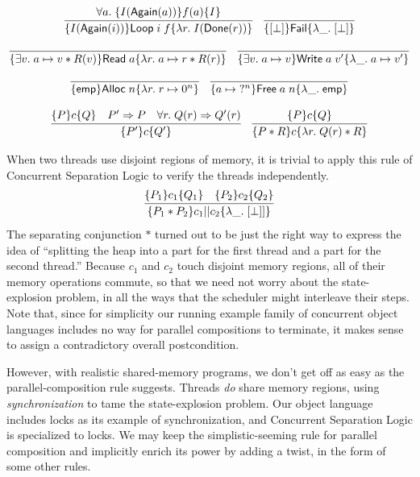 \documentclass{amsbook}
\theoremstyle{definition}
\theoremstyle{remark}
\numberwithin{section}{chapter}
\numberwithin{equation}{chapter}
\begin{document}
$$\infer{\hoare{I(\mt{Again}(i))}{\mt{Loop} \; i \; f}{\lambda r. \; I(\mt{Done}(r))}}{
  \forall a. \; \hoare{I(\mt{Again}(a))}{f(a)}{I}
}
\quad \infer{\hoare{\lift{\bot}}{\mt{Fail}}{\lambda \_. \; \lift{\bot}}}{}$$

$$\infer{\hoare{\exists v. \; \ptsto{a}{v} * R(v)}{\mt{Read} \; a}{\lambda r. \; \ptsto{a}{r} * R(r)}}{}
\quad \infer{\hoare{\exists v. \; \ptsto{a}{v}}{\mt{Write} \; a \; v'}{\lambda \_. \; \ptsto{a}{v'}}}{}$$

$$\infer{\hoare{\emp}{\mt{Alloc} \; n}{\lambda r. \; \ptsto{r}{0^n}}}{}
\quad \infer{\hoare{\ptsto{a}{\; ?^n}}{\mt{Free} \; a \; n}{\lambda \_. \; \emp}}{}$$

$$\infer{\hoare{P'}{c}{Q'}}{
  \hoare{P}{c}{Q}
  & P' \Rightarrow P
  & \forall r. \; Q(r) \Rightarrow Q'(r)
}
\quad \infer{\hoare{P * R}{c}{\lambda r. \; Q(r) * R}}{
  \hoare{P}{c}{Q}
}$$

\modularity
When two threads use disjoint regions of memory, it is trivial to apply this rule of Concurrent Separation Logic to verify the threads independently.
$$\infer{\hoare{P_1 * P_2}{c_1 || c_2}{\lambda \_. \; \lift{\bot}]}}{
  \hoare{P_1}{c_1}{Q_1}
  & \hoare{P_2}{c_2}{Q_2}
}$$
The separating conjunction $*$ turned out to be just the right way to express the idea of ``splitting the heap into a part for the first thread and a part for the second thread.''
Because $c_1$ and $c_2$ touch disjoint memory regions, all of their memory operations commute, so that we need not worry about the state-explosion problem, in all the ways that the scheduler might interleave their steps.
Note that, since for simplicity our running example family of concurrent object languages includes no way for parallel compositions to terminate, it makes sense to assign a contradictory overall postcondition.

However, with realistic shared-memory programs, we don't get off as easy as the parallel-composition rule suggests.
Threads \emph{do} share memory regions, using \emph{synchronization} to tame the state-explosion problem.
Our object language includes locks as its example of synchronization, and Concurrent Separation Logic is specialized to locks.
We may keep the simplistic-seeming rule for parallel composition and implicitly enrich its power by adding a twist, in the form of some other rules.
\end{document}
